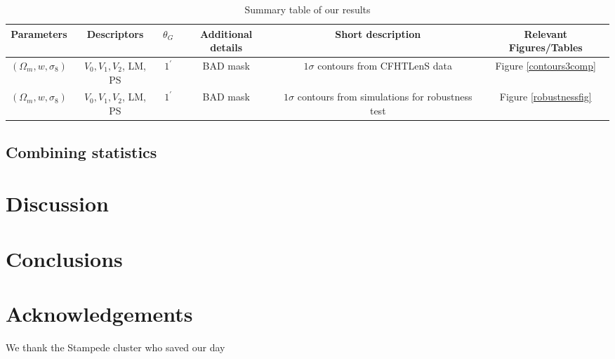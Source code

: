 \documentclass[reprint,aps,prd,superscriptaddress,showkeys,showpacs]{revtex4-1}
\begin{document}
\begin{table*}
\begin{tabular}{c|c|c|c|c||c}
Parameters & Descriptors & $\theta_G$ & Additional details & Short description & Relevant Figures/Tables \\ \hline \hline
$(\Omega_m,w,\sigma_8)$ & $V_0,V_1,V_2$, LM, PS & $1^\prime$ & BAD mask & $1\sigma$ contours from CFHTLenS data & Figure \ref{contours3comp} \\ \hline 
$(\Omega_m,w,\sigma_8)$ & $V_0,V_1,V_2$, LM, PS & $1^\prime$ & BAD mask &\pbox{20cm}{$1\sigma$ contours from simulations \\ for robustness test}  & Figure \ref{robustnessfig} \\
\end{tabular}
\caption{Summary table of our results}
\label{summarytable}
\end{table*}

\subsection{Combining statistics}


\section{Discussion}


\section{Conclusions}

 

\section*{Acknowledgements}
We thank the Stampede cluster who saved our day


\label{lastpage}
\end{document}
